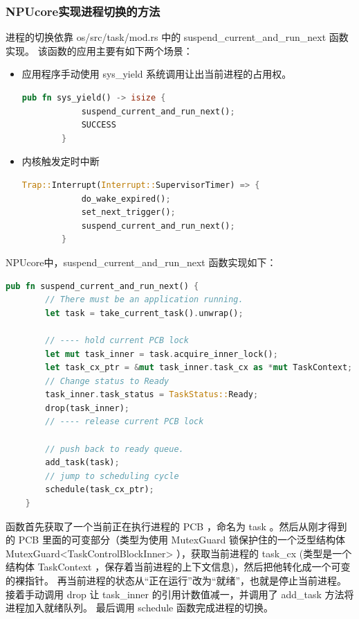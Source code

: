 \subsubsection{NPUcore实现进程切换的方法}
进程的切换依靠 os/src/task/mod.rs 中的 suspend\_current\_and\_run\_next 函数实现。
该函数的应用主要有如下两个场景：
\begin{itemize}
	\item{应用程序手动使用 sys\_yield 系统调用让出当前进程的占用权。}
	\begin{lstlisting}[language={Rust},caption={syscall yield}]
		pub fn sys_yield() -> isize {
			suspend_current_and_run_next();
			SUCCESS
		}
	\end{lstlisting}
	\item{内核触发定时中断}
	\begin{lstlisting}[language={Rust},caption={Timer Interrupt}]
		Trap::Interrupt(Interrupt::SupervisorTimer) => {
			do_wake_expired();
			set_next_trigger();
			suspend_current_and_run_next();
		}
	\end{lstlisting}
\end{itemize}

NPUcore中，suspend\_current\_and\_run\_next 函数实现如下：
\begin{lstlisting}[language={Rust}, caption={suspend current and run next}]
	pub fn suspend_current_and_run_next() {
		// There must be an application running.
		let task = take_current_task().unwrap();
		
		// ---- hold current PCB lock
		let mut task_inner = task.acquire_inner_lock();
		let task_cx_ptr = &mut task_inner.task_cx as *mut TaskContext;
		// Change status to Ready
		task_inner.task_status = TaskStatus::Ready;
		drop(task_inner);
		// ---- release current PCB lock
		
		// push back to ready queue.
		add_task(task);
		// jump to scheduling cycle
		schedule(task_cx_ptr);
	}
\end{lstlisting}

函数首先获取了一个当前正在执行进程的 PCB ，命名为 task 。然后从刚才得到的 PCB 里面的可变部分（类型为使用 MutexGuard 锁保护住的一个泛型结构体
MutexGuard<TaskControlBlockInner> ），获取当前进程的 task\_cx (类型是一个结构体 TaskContext ，保存着当前进程的上下文信息)，然后把他转化成一个可变的裸指针。
再当前进程的状态从“正在运行”改为“就绪”，也就是停止当前进程。接着手动调用 drop 让 task\_inner 的引用计数值减一，并调用了 add\_task 方法将进程加入就绪队列。
最后调用 schedule 函数完成进程的切换。\\

